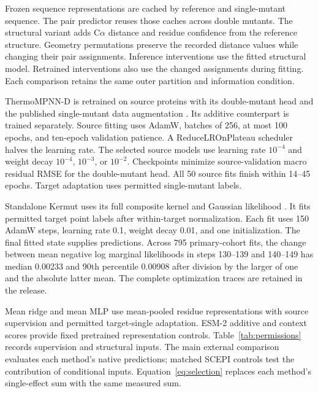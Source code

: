 \documentclass{llncs}
\begin{document}
Frozen sequence representations are cached by reference and single-mutant sequence. The pair predictor reuses those caches across double mutants. The structural variant adds C$\alpha$ distance and residue confidence from the reference structure. Geometry permutations preserve the recorded distance values while changing their pair assignments. Inference interventions use the fitted structural model. Retrained interventions also use the changed assignments during fitting. Each comparison retains the same outer partition and information condition.

ThermoMPNN-D is retrained on source proteins with its double-mutant head and the published single-mutant data augmentation \citep{dieckhaus2025}. Its additive counterpart is trained separately. Source fitting uses AdamW, batches of 256, at most 100 epochs, and ten-epoch validation patience. A ReduceLROnPlateau scheduler halves the learning rate. The selected source models use learning rate $10^{-4}$ and weight decay $10^{-4}$, $10^{-3}$, or $10^{-2}$. Checkpoints minimize source-validation macro residual RMSE for the double-mutant head. All 50 source fits finish within 14--45 epochs. Target adaptation uses permitted single-mutant labels.

Standalone Kermut uses its full composite kernel and Gaussian likelihood \citep{groth2024}. It fits permitted target point labels after within-target normalization. Each fit uses 150 AdamW steps, learning rate 0.1, weight decay 0.01, and one initialization. The final fitted state supplies predictions. Across 795 primary-cohort fits, the change between mean negative log marginal likelihoods in steps 130--139 and 140--149 has median 0.00233 and 90th percentile 0.00908 after division by the larger of one and the absolute latter mean. The complete optimization traces are retained in the release.

Mean ridge and mean MLP use mean-pooled residue representations with source supervision and permitted target-single adaptation. ESM-2 additive and context scores provide fixed pretrained representation controls. Table~\ref{tab:permissions} records supervision and structural inputs. The main external comparison evaluates each method's native predictions; matched SCEPI controls test the contribution of conditional inputs. Equation~\eqref{eq:selection} replaces each method's single-effect sum with the same measured sum.
\end{document}
